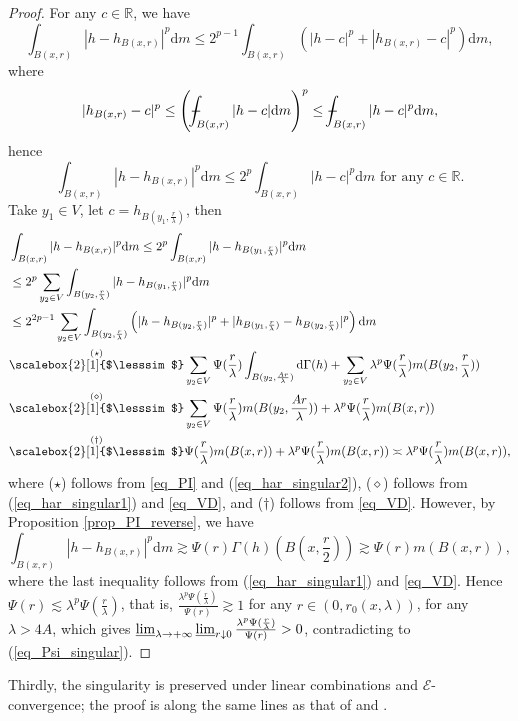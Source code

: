 \documentclass[11pt,a4paper]{article}
\numberwithin{equation}{section}
\def\Xint#1{\mathchoice
{\XXint\displaystyle\textstyle{#1}}%
{\XXint\textstyle\scriptstyle{#1}}%
{\XXint\scriptstyle\scriptscriptstyle{#1}}%
{\XXint\scriptscriptstyle\scriptscriptstyle{#1}}%
\!\int}
\def\XXint#1#2#3{{\setbox0=\hbox{$#1{#2#3}{\int}$ }
\vcenter{\hbox{$#2#3$ }}\kern-.6\wd0}}
\def\dashint{\Xint-}
\theoremstyle{plain}
\theoremstyle{definition}
\begin{document}
\begin{proof}
For any $c\in\mathbb{R}$, we have
$$\int_{B(x,r)}|h-h_{B(x,r)}|^p\mathrm{d} m\le2^{p-1}\int_{B(x,r)}\left(|h-c|^p+|h_{B(x,r)}-c|^p\right)\mathrm{d} m,$$
where
$$|h_{B(x,r)}-c|^p\le\left(\dashint_{B(x,r)}|h-c|\mathrm{d} m\right)^p\le\dashint_{B(x,r)}|h-c|^p\mathrm{d} m,$$
hence
$$\int_{B(x,r)}|h-h_{B(x,r)}|^p\mathrm{d} m\le2^p\int_{B(x,r)}|h-c|^p\mathrm{d} m\text{ for any }c\in\mathbb{R}.$$
Take $y_1\in V$, let $c=h_{B(y_1,\frac{r}{\lambda})}$, then
\begin{align*}
&\int_{B(x,r)}|h-h_{B(x,r)}|^p\mathrm{d} m\le2^p\int_{B(x,r)}|h-h_{B(y_1,\frac{r}{\lambda})}|^p\mathrm{d} m\\
&\le2^p\sum_{y_2\in V}\int_{B(y_2,\frac{r}{\lambda})}|h-h_{B(y_1,\frac{r}{\lambda})}|^p\mathrm{d} m\\
&\le2^{2p-1}\sum_{y_2\in V}\int_{B(y_2,\frac{r}{\lambda})}\left(|h-h_{B(y_2,\frac{r}{\lambda})}|^p+|h_{B(y_1,\frac{r}{\lambda})}-h_{B(y_2,\frac{r}{\lambda})}|^p\right)\mathrm{d} m\\
&\overset{(\star)}{\scalebox{2}[1]{$\lesssim$}}\sum_{y_2\in V}\Psi(\frac{r}{\lambda})\int_{B(y_2,\frac{Ar}{\lambda})}\mathrm{d}\Gamma(h)+\sum_{y_2\in V}\lambda^p\Psi(\frac{r}{\lambda})m(B(y_2,\frac{r}{\lambda}))\\
&\overset{(\diamond)}{\scalebox{2}[1]{$\lesssim$}}\sum_{y_2\in V}\Psi(\frac{r}{\lambda})m(B(y_2,\frac{Ar}{\lambda}))+\lambda^p\Psi(\frac{r}{\lambda})m(B(x,r))\\
&\overset{(\dagger)}{\scalebox{2}[1]{$\lesssim$}}\Psi(\frac{r}{\lambda})m(B(x,r))+\lambda^p\Psi(\frac{r}{\lambda})m(B(x,r))\asymp\lambda^p\Psi(\frac{r}{\lambda})m(B(x,r)),
\end{align*}
where ($\star$) follows from \ref{eq_PI} and (\ref{eq_har_singular2}), ($\diamond$) follows from (\ref{eq_har_singular1}) and \ref{eq_VD}, and ($\dagger$) follows from \ref{eq_VD}. However, by Proposition \ref{prop_PI_reverse}, we have
$$\int_{B(x,r)}|h-h_{B(x,r)}|^p\mathrm{d} m\gtrsim\Psi(r)\Gamma(h)(B(x,\frac{r}{2}))\gtrsim\Psi(r)m(B(x,r)),$$
where the last inequality follows from (\ref{eq_har_singular1}) and \ref{eq_VD}. Hence $\Psi(r)\lesssim\lambda^p\Psi(\frac{r}{\lambda})$, that is, $\frac{\lambda^p\Psi(\frac{r}{\lambda})}{\Psi(r)}\gtrsim1$ for any $r\in(0,r_0(x,\lambda))$, for any $\lambda>4A$, which gives $\varliminf_{\lambda\to+\infty}\varliminf_{r\downarrow0}\frac{\lambda^p\Psi(\frac{r}{\lambda})}{\Psi(r)}>0$, contradicting to (\ref{eq_Psi_singular}).
\end{proof}

Thirdly, the singularity is preserved under linear combinations and $\mathcal{E}$-convergence; the proof is along the same lines as that of \cite[LEMMA 3.6 (b)]{KM20} and \cite[LEMMA 3.7 (b)]{KM20}.
\end{document}
